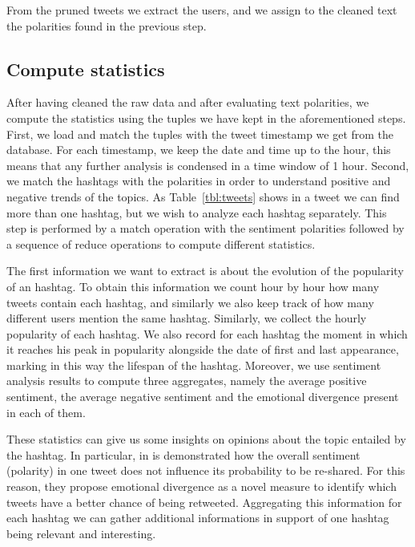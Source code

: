 From the pruned tweets we extract the users, and we assign to the cleaned text the polarities found in the previous step. 


\subsection{Compute statistics}
\label{sec:statistics}

After having cleaned the raw data and after evaluating text polarities, we compute the statistics using the tuples we have kept in the aforementioned steps. 
First, we load and match the tuples with the tweet timestamp we get from the database.
For each timestamp, we  keep the date and time up to the hour, this means that any further analysis is condensed in a time window of 1 hour.
Second, we match the hashtags with the polarities in order to understand positive and negative trends of the topics. 
As Table~\ref{tbl:tweets} shows in a tweet we can find more than one hashtag, but we wish to analyze each hashtag separately.
This step is performed by a match operation with the sentiment polarities followed by a sequence of reduce operations to compute different statistics.

The first information we want to extract is about the evolution of the popularity of an hashtag.
To obtain this information we count hour by hour how many tweets contain each hashtag, and similarly we also keep track of how many different users mention the same hashtag.
Similarly, we collect the hourly popularity of each hashtag.
We also record for each hashtag the moment in which it reaches his peak in popularity alongside the date of first and last appearance, marking in this way the lifespan of the hashtag.
Moreover, we use sentiment analysis results to compute three aggregates, namely the average positive sentiment, the average negative sentiment and the emotional divergence present in each of them.

These statistics can give us some insights on opinions about the topic entailed by the hashtag.
In particular, in \cite{DBLP:conf:icwsm:PfitznerGS12}  is demonstrated how the overall sentiment (polarity) in one tweet does not influence its probability to be re-shared.
For this reason, they propose emotional divergence as a novel measure to identify which tweets have a better chance of being retweeted.
Aggregating this information for each hashtag we can gather additional informations in support of one hashtag being relevant and interesting.




